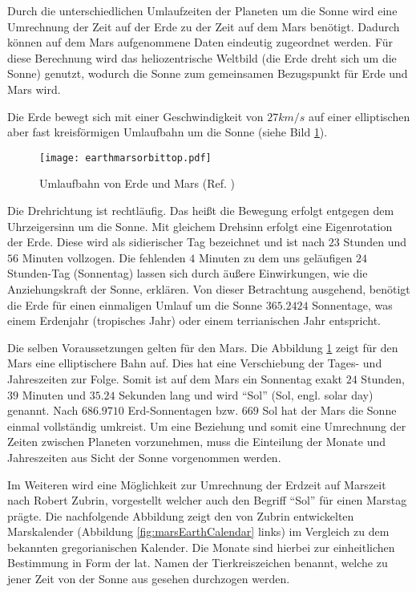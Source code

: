 Durch die unterschiedlichen Umlaufzeiten der Planeten um die Sonne wird eine
Umrechnung der Zeit auf der Erde zu der Zeit auf dem Mars ben{\"o}tigt.
Dadurch k{\"o}nnen auf dem Mars aufgenommene Daten eindeutig zugeordnet
werden.
F{\"u}r diese Berechnung wird das heliozentrische Weltbild (die Erde dreht sich
um die Sonne) genutzt, wodurch die Sonne zum gemeinsamen Bezugspunkt f{\"u}r
Erde und Mars wird.

Die Erde bewegt sich mit einer Geschwindigkeit von $27 km/s$ auf einer
elliptischen aber fast kreisf{\"o}rmigen Umlaufbahn um die Sonne (siehe Bild
\ref{fig:marsEarthOrbit}).

\begin{figure}[H]
	\centering
	\texttt{[image: earthmarsorbittop.pdf]}
	\label{fig:marsEarthOrbit}
	\caption{Umlaufbahn von Erde und Mars (Ref. \cite{img1})}
\end{figure}

Die Drehrichtung ist rechtl{\"a}ufig. Das hei{\ss}t die Bewegung erfolgt
entgegen dem Uhrzeigersinn um die Sonne. Mit gleichem Drehsinn erfolgt eine Eigenrotation
der Erde. Diese wird als sidierischer Tag bezeichnet und ist nach $23$ Stunden
und $56$ Minuten vollzogen. Die fehlenden $4$ Minuten zu dem uns gel{\"a}ufigen
$24$ Stunden-Tag (Sonnentag) lassen sich durch {\"a}u{\ss}ere Einwirkungen,
wie die Anziehungskraft der Sonne, erkl{\"a}ren. Von dieser Betrachtung
ausgehend, ben{\"o}tigt die Erde f{\"u}r einen einmaligen Umlauf um die Sonne
$365.2424$ Sonnentage, was einem Erdenjahr (tropisches Jahr) oder einem
terrianischen Jahr entspricht.

Die selben Voraussetzungen gelten f{\"u}r den Mars. Die Abbildung
\ref{fig:marsEarthOrbit} zeigt f{\"u}r den Mars eine elliptischere Bahn
auf. Dies hat eine Verschiebung der Tages- und Jahreszeiten zur Folge. Somit ist
auf dem Mars ein Sonnentag exakt $24$ Stunden, $39$ Minuten und $35.24$ Sekunden lang und
wird "`Sol"' (Sol, engl. solar day) genannt. Nach $686.9710$ Erd-Sonnentagen
bzw. $669$ Sol hat der Mars die Sonne einmal vollst{\"a}ndig umkreist. Um eine Beziehung
und somit eine Umrechnung der Zeiten zwischen Planeten vorzunehmen, muss die
Einteilung der Monate und Jahreszeiten aus Sicht der Sonne vorgenommen werden.

Im Weiteren wird eine M{\"o}glichkeit zur Umrechnung der Erdzeit auf Marszeit
nach Robert Zubrin, vorgestellt welcher auch den Begriff "`Sol"'
f{\"u}r einen Marstag pr{\"a}gte. Die nachfolgende Abbildung zeigt den von Zubrin entwickelten
Marskalender (Abbildung \ref{fig:marsEarthCalendar} links) im Vergleich zu dem
bekannten gregorianischen Kalender. Die Monate sind hierbei zur einheitlichen
Bestimmung in Form der lat. Namen der Tierkreiszeichen benannt, welche zu jener
Zeit von der Sonne aus gesehen durchzogen werden.

